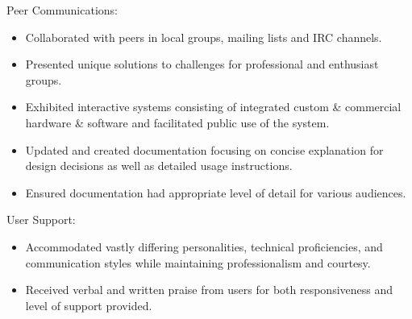 \documentclass[line,margin]{res}
\begin{document}
\begin{resume}
    Peer Communications:
    \vspace{1 mm}
    \begin{itemize}
        \item Collaborated with peers in local groups, mailing lists and
            IRC channels.
        \item Presented unique solutions to challenges for professional
            and enthusiast groups.
        \item Exhibited interactive systems consisting of integrated custom
            \& commercial hardware \& software and facilitated public use
            of the system.
        \item Updated and created documentation focusing on concise
            explanation for design decisions as well as detailed usage
            instructions.
        \item Ensured documentation had appropriate level of detail for
            various audiences.
    \end{itemize}

    User Support:
    \vspace{1 mm}
    \begin{itemize}
        \item Accommodated vastly differing personalities, technical
            proficiencies, and communication styles while maintaining
            professionalism and courtesy.
        \item Received verbal and written praise from users for both
            responsiveness and level of support provided.
    \end{itemize}








\end{resume}
\end{document}
